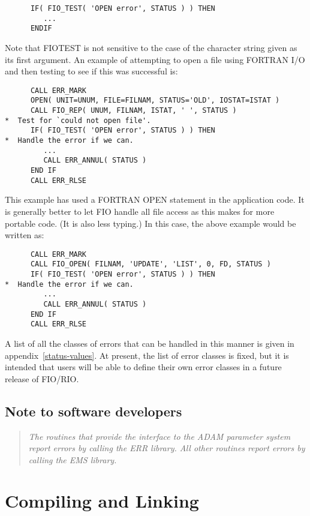 \documentclass[twoside,11pt]{article}
\renewcommand{\_}{\texttt{\symbol{95}}}
\begin{document}
\begin{verbatim}
      IF( FIO_TEST( 'OPEN error', STATUS ) ) THEN
         ...
      ENDIF
\end{verbatim}

Note that FIO\_TEST is not sensitive to the case of the character string
given as its first argument. An example of attempting to open a file using
FORTRAN I/O and then testing to see if this was successful is:

\begin{verbatim}
      CALL ERR_MARK
      OPEN( UNIT=UNUM, FILE=FILNAM, STATUS='OLD', IOSTAT=ISTAT )
      CALL FIO_REP( UNUM, FILNAM, ISTAT, ' ', STATUS )
*  Test for `could not open file'.
      IF( FIO_TEST( 'OPEN error', STATUS ) ) THEN
*  Handle the error if we can.
         ...
         CALL ERR_ANNUL( STATUS )
      END IF
      CALL ERR_RLSE
\end{verbatim}

This example has used a FORTRAN OPEN statement in the application code. It is
generally better to let FIO handle all file access as this makes for more
portable code. (It is also less typing.) In this case, the above example would
be written as:

\begin{verbatim}
      CALL ERR_MARK
      CALL FIO_OPEN( FILNAM, 'UPDATE', 'LIST', 0, FD, STATUS )
      IF( FIO_TEST( 'OPEN error', STATUS ) ) THEN
*  Handle the error if we can.
         ...
         CALL ERR_ANNUL( STATUS )
      END IF
      CALL ERR_RLSE
\end{verbatim}

A list of all the classes of errors that can be handled in this manner is given
in appendix~\ref{status-values}. At present, the list of error classes is
fixed, but it is intended that users will be able to define their own error
classes in a future release of FIO/RIO.

\subsection{Note to software developers}
\begin{quote}
{\it 
The routines that provide the interface to the ADAM parameter system report
errors by calling the ERR library. All other routines report errors by calling
the EMS library.}
\end{quote}

\section{Compiling and Linking}
\end{document}

